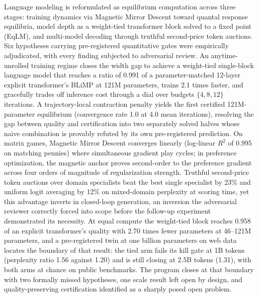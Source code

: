 
Language modeling is reformulated as equilibrium computation across three stages: training dynamics via Magnetic Mirror Descent toward quantal response equilibria, model depth as a weight-tied transformer block solved to a fixed point (EqLM), and multi-model decoding through truthful second-price token auctions. Six hypotheses carrying pre-registered quantitative gates were empirically adjudicated, with every finding subjected to adversarial review. An anytime-unrolled training regime closes the width gap to achieve a weight-tied single-block language model that reaches a ratio of 0.991 of a parameter-matched 12-layer explicit transformer's BLiMP at 121M parameters, trains 2.1 times faster, and gracefully trades off inference cost through a dial over budgets $\{4,8,12\}$ iterations. A trajectory-local contraction penalty yields the first certified 121M-parameter equilibrium (convergence rate 1.0 at 4.0 mean iterations), resolving the gap between quality and certification into two separately solved halves whose naive combination is provably refuted by its own pre-registered prediction. On matrix games, Magnetic Mirror Descent converges linearly (log-linear $R^2$ of 0.995 on matching pennies) where simultaneous gradient play cycles; in preference optimization, the magnetic anchor proves second-order to the preference gradient across four orders of magnitude of regularization strength. Truthful second-price token auctions over domain specialists beat the best single specialist by 23\% and uniform logit averaging by 12\% on mixed-domain perplexity at scoring time, yet this advantage inverts in closed-loop generation, an inversion the adversarial reviewer correctly forced into scope before the follow-up experiment demonstrated its necessity. At equal compute the weight-tied block reaches 0.958 of an explicit transformer's quality with 2.70 times fewer parameters at 46--121M parameters, and a pre-registered twin at one billion parameters on web data locates the boundary of that result: the tied arm fails its kill gate at 1B tokens (perplexity ratio 1.56 against 1.20) and is still closing at 2.5B tokens (1.31), with both arms at chance on public benchmarks. The program closes at that boundary with two formally missed hypotheses, one scale result left open by design, and quality-preserving certification identified as a sharply posed open problem.
